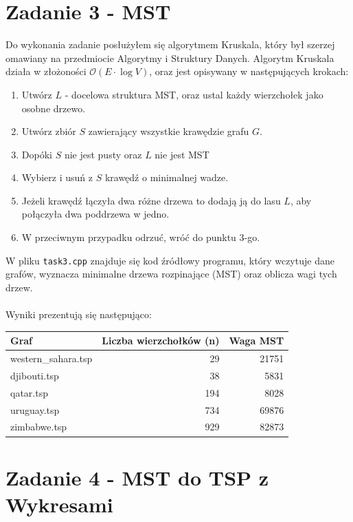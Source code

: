 \documentclass{article}
\begin{document}
\section{Zadanie 3 - MST}

Do wykonania zadanie posłużyłem się algorytmem Kruskala, który był szerzej omawiany na przedmiocie
Algorytmy i Struktury Danych. Algorytm Kruskala działa w złożoności $\mathcal{O}(E \cdot \log V)$, oraz jest opisywany w następujących krokach:

\begin{enumerate}
    \item Utwórz $L$ - docelowa struktura MST, oraz ustal każdy wierzchołek jako osobne drzewo.
    \item Utwórz zbiór $S$ zawierający wszystkie krawędzie grafu $G$.
    \item Dopóki $S$ nie jest pusty oraz $L$ nie jest MST
        \item Wybierz i usuń z $S$ krawędź o minimalnej wadze.
        \item Jeżeli krawędź łączyła dwa różne drzewa to dodają ją do lasu $L$, aby połączyła dwa poddrzewa w jedno.
        \item W przeciwnym przypadku odrzuć, wróć do punktu 3-go.
\end{enumerate}

W pliku \texttt{task3.cpp} znajduje się kod źródłowy programu, 
który wczytuje dane grafów, wyznacza minimalne drzewa rozpinające (MST) oraz oblicza wagi tych drzew.\\\\

\noindent
Wyniki prezentują się następująco:
\begin{longtable}{|l|r|r|}
\hline
\textbf{Graf} & \textbf{Liczba wierzchołków (n)} & \textbf{Waga MST} \\ \hline
western\_sahara.tsp & 29 & 21751 \\ 
djibouti.tsp & 38 & 5831 \\ 
qatar.tsp & 194 & 8028 \\ 
uruguay.tsp & 734 & 69876 \\ 
zimbabwe.tsp & 929 & 82873 \\ \hline
\end{longtable}

\section{Zadanie 4 - MST do TSP z Wykresami}
\end{document}
